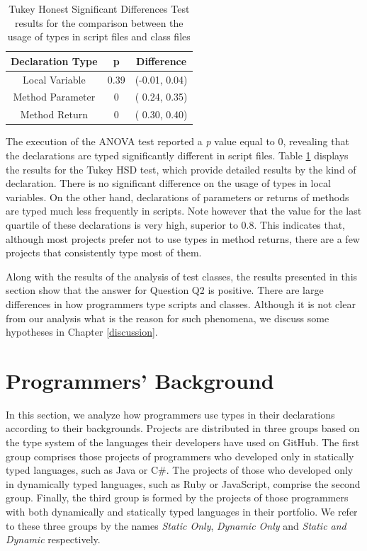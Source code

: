 \documentclass[msc]{ppgccufmg}
\begin{document}
\begin{table}[ht]
\centering{}%

\caption{Tukey Honest Significant Differences Test results for the comparison between the usage of types in script files and class files}
\begin{tabular}{|c|c|c|}
\hline 
Declaration Type & p & Difference \\
\hline 
\hline 
Local Variable   & 0.39 & (-0.01, 0.04) \\ \hline
Method Parameter & 0    & ( 0.24, 0.35) \\ \hline
Method Return    & 0    & ( 0.30, 0.40) \\ \hline
\end{tabular}
\label{tab:script_utest_all}
\end{table}

The execution of the ANOVA test reported a \emph{p} value equal to 0, revealing that the declarations are typed significantly different in script files.
Table \ref{tab:script_utest_all} displays the results for the Tukey HSD test, which provide detailed results by the kind of declaration.
There is no significant difference on the usage of types in local variables.
On the other hand, declarations of parameters or returns of methods are typed much less frequently in scripts.
Note however that the value for the last quartile of these declarations is very high, superior to 0.8.
This indicates that, although most projects prefer not to use types in method returns, there are a few projects that consistently type most of them.

Along with the results of the analysis of test classes, the results presented in this section show that the answer for Question Q2 is positive.
There are large differences in how programmers type scripts and classes.
Although it is not clear from our analysis what is the reason for such phenomena, we discuss some hypotheses in Chapter \ref{discussion}.




\section{Programmers' Background\label{sec:results-background}}
In this section, we analyze how programmers use types in their declarations according to their backgrounds.
Projects are distributed in three groups based on the type system of the languages their developers have used on GitHub.
The first group comprises those projects of programmers who developed only in statically typed languages, such as Java or C\#.
The projects of those who developed only in dynamically typed languages, such as Ruby or JavaScript, comprise the second group.
Finally, the third group is formed by the projects of those programmers with both dynamically and statically typed languages in their portfolio.
We refer to these three groups by the names \emph{Static Only}, \emph{Dynamic Only} and \emph{Static and Dynamic} respectively.
\end{document}
